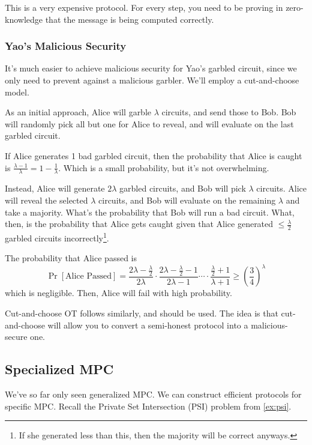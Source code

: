 This is a very expensive protocol. For every step, you need to be proving in zero-knowledge that the message is being computed correctly.

\subsubsection{Yao's Malicious Security}
It's much easier to achieve malicious security for Yao's garbled circuit, since we only need to prevent against a malicious garbler. We'll employ a cut-and-choose model.


As an initial approach, Alice will garble $\lambda$ circuits, and send those to Bob. Bob will randomly pick all but one for Alice to reveal, and will evaluate on the last garbled circuit.

If Alice generates 1 bad garbled circuit, then the probability that Alice is caught is $\frac{\lambda - 1}{\lambda} = 1 - \frac{1}{\lambda}$. Which is a small probability, but it's not overwhelming.

Instead, Alice will generate $2\lambda$ garbled circuits, and Bob will pick $\lambda$ circuits. Alice will reveal the selected $\lambda$ circuits, and Bob will evaluate on the remaining $\lambda$ and take a majority. What's the probability that Bob will run a bad circuit. What, then, is the probability that Alice gets caught given that Alice generated $\leq \frac{\lambda}{2}$ garbled circuits incorrectly\footnote{If she generated less than this, then the majority will be correct anyways.}.

The probability that Alice passed is
\[\Pr\left[ \text{Alice Passed} \right] = \frac{2\lambda - \frac{\lambda}{2}}{2\lambda}\cdot \frac{2\lambda - \frac{\lambda}{2} - 1}{2\lambda - 1} \cdots \cdot \frac{\frac{\lambda}{2} + 1}{\lambda + 1} \geq \left( \frac{3}{4} \right)^\lambda\]
which is negligible. Then, Alice will fail with high probability.

Cut-and-choose OT follows similarly, and should be used. The idea is that cut-and-choose will allow you to convert a semi-honest protocol into a malicious-secure one.

\subsection{Specialized MPC}
We've so far only seen generalized MPC. We can construct efficient protocols for specific MPC. Recall the Private Set Intersection (PSI) problem from \cref{ex:psi}.

